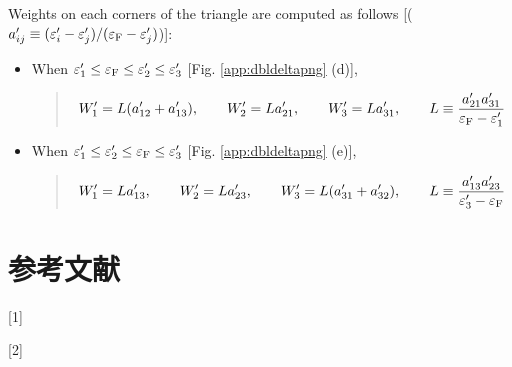 \documentclass[letterpaper,10pt,dvipdfmx,openany]{sphinxmanual}
\begin{document}
\sphinxAtStartPar
Weights on each corners of the triangle are computed as follows
{[}(\(a'_{i j} \equiv (\varepsilon'_i - \varepsilon'_j)/(\varepsilon_{\rm F} - \varepsilon'_j)\)){]}:
\begin{itemize}
\item {} 
\sphinxAtStartPar
When \(\varepsilon'_1 \leq \varepsilon_{\rm F} \leq \varepsilon'_2 \leq \varepsilon'_3\) {[}Fig. \ref{app:dbldeltapng} (d){]},
\begin{quote}
\begin{equation*}
\begin{split}\begin{align}
W'_1 = L (a'_{1 2} + a'_{1 3}), \qquad
W'_2 = L a'_{2 1}, \qquad
W'_3 = L a'_{3 1}, \qquad
L \equiv \frac{a'_{2 1} a'_{3 1}}{\varepsilon_{\rm F} - \varepsilon'_{1}}
\end{align}\end{split}
\end{equation*}\end{quote}

\item {} 
\sphinxAtStartPar
When \(\varepsilon'_1 \leq \varepsilon'_2 \leq \varepsilon_{\rm F} \leq \varepsilon'_3\) {[}Fig. \ref{app:dbldeltapng} (e){]},
\begin{quote}
\begin{equation*}
\begin{split}\begin{align}
W'_1 = L a'_{1 3}, \qquad
W'_2 = L a'_{2 3}, \qquad
W'_3 = L (a'_{3 1} + a'_{3 2}), \qquad
L \equiv \frac{a'_{1 3} a'_{2 3}}{\varepsilon'_{3} - \varepsilon_{\rm F}}
\end{align}\end{split}
\end{equation*}\end{quote}

\end{itemize}

\sphinxstepscope


\chapter{参考文献}
\label{\detokenize{ref:ref}}\label{\detokenize{ref:id1}}\label{\detokenize{ref::doc}}
\sphinxAtStartPar
{[}1{]} 

\sphinxAtStartPar
{[}2{]} 



\renewcommand{\indexname}{索引}
\printindex
\end{document}
